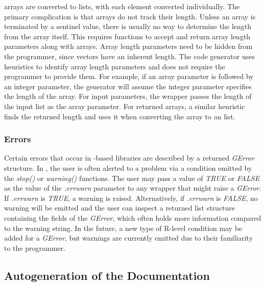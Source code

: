 \documentclass[article]{jss}
\begin{document}
 arrays are converted to  lists, with each
element
converted individually. The primary complication is that 
arrays 
do not track their length. Unless an array is terminated by a sentinel
value,
there is usually no way to determine the length from the array itself.
This 
requires  functions to accept and return array length
parameters
along with arrays. Array length parameters need to be hidden from the
 programmer, since  vectors have an inherent
length.
The code generator uses heuristics to identify array length parameters
and
does not require the  programmer to provide them. For
example,
if an array parameter is followed by an integer parameter, the
generator
will assume the integer parameter specifies the length of the array.
For input
parameters, the wrapper passes the length of the input 
list as
the array parameter. For returned arrays, a similar heuristic finds
the returned
length and uses it when converting the array to an  list.

\subsubsection{Errors}

Certain errors that occur in -based libraries are described
by a returned \emph{GError} structure. In , the user is
often alerted to a problem via a condition emitted by the
\emph{stop()} or \emph{warning()} functions.  The user may pass a
value of \emph{TRUE} or \emph{FALSE} as the value of the
\emph{.errwarn} parameter to any wrapper that might raise a
\emph{GError}.  If \emph{.errwarn} is \emph{TRUE}, a warning is
raised.  Alternatively, if \emph{.errwarn} is \emph{FALSE}, no warning
will be emitted and the user can inspect a returned list structure
containing the fields of the \emph{GError}, which often holds more
information compared to the warning string. In the future, a new type of R-level condition may be
added for
a \emph{GError}, but warnings are currently emitted due to their
familiarity to the  programmer.


\subsection{Autogeneration of the Documentation}
\end{document}
